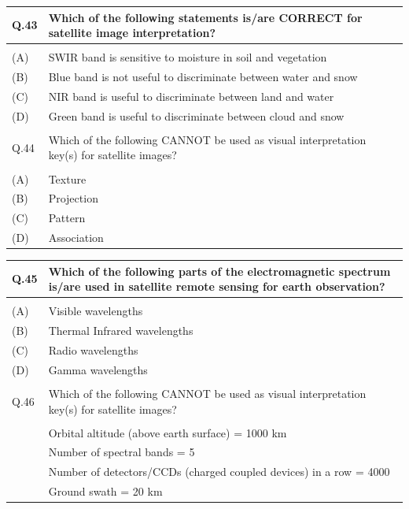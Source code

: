 \documentclass[12pt]{article}
\begin{document}
\begin{table}[H]
\renewcommand{\arraystretch}{3}
\setlength{\tabcolsep}{8pt}
\begin{tabular}{|l|p{15cm}|}
\hline
 
Q.43 & Which of the following statements is/are CORRECT for satellite image
interpretation?\\ \hline 
 & \\ \hline
(A)&SWIR band is sensitive to moisture in soil and vegetation\\ \hline
(B)&Blue band is not useful to discriminate between water and snow\\ \hline
(C)&NIR band is useful to discriminate between land and water\\ \hline
(D)&Green band is useful to discriminate between cloud and snow\\ \hline
 & \\ \hline



Q.44 & Which of the following CANNOT be used as visual interpretation key(s) for
satellite images?\\ \hline 
 & \\ \hline
(A)&Texture\\ \hline
(B)&Projection\\ \hline
(C)&Pattern\\ \hline
(D)&Association\\ \hline
\end{tabular}
\end{table}



\begin{table}[H]
\renewcommand{\arraystretch}{3}
\setlength{\tabcolsep}{8pt}
\begin{tabular}{|l|p{15cm}|}
\hline
 
Q.45 & Which of the following parts of the electromagnetic spectrum is/are used in
satellite remote sensing for earth observation?\\ \hline 
 & \\ \hline
(A)&Visible wavelengths\\ \hline
(B)&Thermal Infrared wavelengths\\ \hline
(C)&Radio wavelengths\\ \hline
(D)&Gamma wavelengths\\ \hline
 & \\ \hline
Q.46& Which of the following CANNOT be used as visual interpretation key(s) for
satellite images?\\\hline
 & \\ \hline
 & Orbital altitude (above earth surface) = 1000 km\\
 &Number of spectral bands = 5\\
 &Number of detectors/CCDs (charged coupled devices) in a row = 4000\\
 &Ground swath = 20 km\\\hline



\end{tabular}
\end{table}
\end{document}
